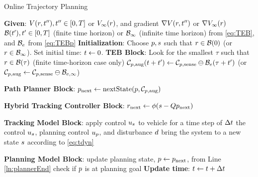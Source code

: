\begin{algorithm}	
	\caption{Online Trajectory Planning}
	\label{alg:algOnline}
	\begin{algorithmic}[1]
		\STATE \textbf{Given}: \label{ln:gStart}
		\STATE $V(r, t''), t'' \in [0, T]$ or $V_\infty(r)$, and gradient $\nabla V(r, t'')$ or $\nabla V_\infty(r)$
 		\STATE $\mathcal B(t'), t' \in [0,T]$ (finite time horizon) or $\mathcal B_\infty$ (infinite time horizon) from \eqref{eq:TEB}, and $\mathcal B_e$ from \eqref{eq:TEBp} \label{ln:gEnd}
    \STATE \textbf{Initialization}: \label{ln:Istart}
		\STATE Choose $p, s$ such that $r \in \mathcal B(0)$ (or $r\in\mathcal B_\infty$).
    \STATE Set initial time: $t \leftarrow 0$. \label{ln:Iend}
		\STATE \textbf{TEB Block}: \label{ln:obsStart}
    \STATE Look for the smallest $\tau$ such that $r \in \mathcal B(\tau)$ (finite time-horizon case only)
		\STATE $\mathcal C_{p,\text{aug}}(t + t') \leftarrow \mathcal C_{p,\text{sense}} \ominus \mathcal B_e(\tau + t')$ \label{ln:obsEnd}
    \STATE (or $\mathcal C_{p,\text{aug}} \leftarrow \mathcal C_{p,\text{sense}} \ominus \mathcal B_{e, \infty}$) 
		
		\STATE \textbf{Path Planner Block}:\label{ln:plannerStart}
		\STATE $p_\text{next} \leftarrow \text{nextState}(p, \mathcal C_{p,\text{aug}})$\label{ln:plannerEnd}
		
		\STATE \textbf{Hybrid Tracking Controller Block}:\label{ln:controllerStart}
		\STATE $r_\text{next} \leftarrow \phi(s - Qp_\text{next})$
		
		\ELSE {} 
           \ENDIF \label{ln:controllerEnd}
		
		\STATE \textbf{Tracking Model Block}: \label{ln:trackingStart}
		\STATE apply control $u_s$ to vehicle for a time step of $\Delta t$
    \STATE the control $u_s$, planning control $u_p$, and disturbance $d$ bring the system to a new state $s$ according to \eqref{eq:tdyn} \label{ln:trackingEnd}
		
		\STATE \textbf{Planning Model Block}:\label{ln:planningStart}
		\STATE update planning state, $p \leftarrow p_\text{next}$, from Line \ref{ln:plannerEnd}
		\STATE check if $p$ is at planning goal \label{ln:planningEnd}
    \STATE \textbf{Update time}:
    \STATE $t \leftarrow t + \Delta t$
		\ENDWHILE
	\end{algorithmic}
\end{algorithm}
